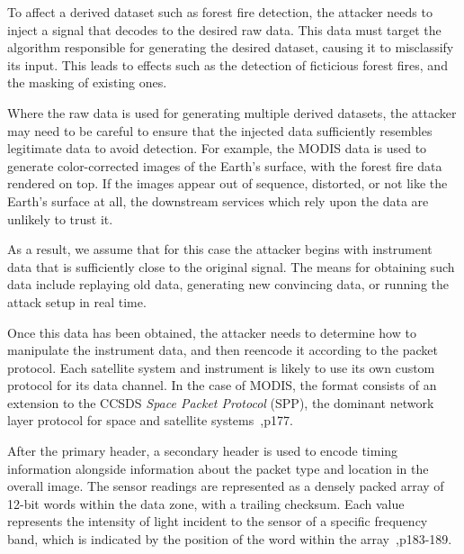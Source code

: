 To affect a derived dataset such as forest fire detection, the attacker needs to inject a signal that decodes to the desired raw data.
This data must target the algorithm responsible for generating the desired dataset, causing it to misclassify its input.
This leads to effects such as the detection of ficticious forest fires, and the masking of existing ones. %

Where the raw data is used for generating multiple derived datasets, the attacker may need to be careful to ensure that the injected data sufficiently resembles legitimate data to avoid detection. %
For example, the MODIS data is used to generate color-corrected images of the Earth's surface, with the forest fire data rendered on top.
If the images appear out of sequence, distorted, or not like the Earth's surface at all, the downstream services which rely upon the data are unlikely to trust it.

As a result, we assume that for this case the attacker begins with instrument data that is sufficiently close to the original signal.
The means for obtaining such data include replaying old data, generating new convincing data, or running the attack setup in real time.



Once this data has been obtained, the attacker needs to determine how to manipulate the instrument data, and then reencode it according to the packet protocol.
Each satellite system and instrument is likely to use its own custom protocol for its data channel.
In the case of MODIS, the format consists of an extension to the CCSDS \textit{Space Packet Protocol} (SPP), the dominant network layer protocol for space and satellite systems~\cite{modisDescription},p177.

After the primary header, a secondary header is used to encode timing information alongside information about the packet type and location in the overall image.
The sensor readings are represented as a densely packed array of 12-bit words within the data zone, with a trailing checksum.
Each value represents the intensity of light incident to the sensor of a specific frequency band, which is indicated by the position of the word within the array~\cite{modisDescription},p183-189.

